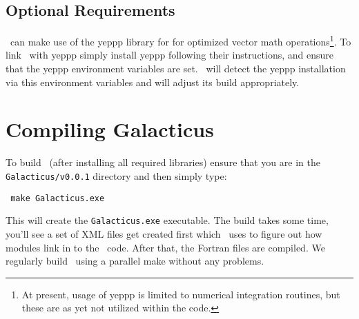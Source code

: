 \subsection{Optional Requirements}

\glc\ can make use of the \gls{yeppp} library for for optimized vector math operations\footnote{At present, usage of \proect\gls{yeppp} is limited to numerical integration routines, but these are as yet not utilized within the code.}. To link \glc\ with \gls{yeppp} simply install \gls{yeppp} following their instructions, and ensure that the \gls{yeppp} environment variables are set. \glc\ will detect the \gls{yeppp} installation via this environment variables and will adjust its build appropriately.

\section{Compiling Galacticus}

To build \glc\ (after installing all required libraries) ensure that you are in the {\tt Galacticus/v0.0.1} directory and then simply type:
\begin{verbatim}
 make Galacticus.exe
\end{verbatim}
This will create the {\tt Galacticus.exe} executable. The build takes some time, you'll see a set of XML files get created first which \glc\ uses to figure out how modules link in to the \glc\ code. After that, the Fortran files are compiled. We regularly build \glc\ using a parallel make without any problems.

